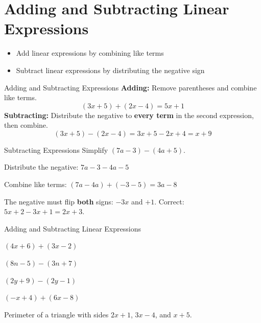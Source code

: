 \section{Adding and Subtracting Linear Expressions}

\begin{learningGoals}
\begin{itemize}
    \item Add linear expressions by combining like terms
    \item Subtract linear expressions by distributing the negative sign
\end{itemize}
\end{learningGoals}

\begin{conceptBox}{Adding and Subtracting Expressions}
\textbf{Adding:} Remove parentheses and combine like terms.
$$(3x + 5) + (2x - 4) = 5x + 1$$
\textbf{Subtracting:} Distribute the negative to \textbf{every term} in the second expression, then combine.
$$(3x + 5) - (2x - 4) = 3x + 5 - 2x + 4 = x + 9$$
\end{conceptBox}

\begin{workedExample}{Subtracting Expressions}
Simplify $(7a - 3) - (4a + 5)$.

Distribute the negative: $7a - 3 - 4a - 5$

Combine like terms: $(7a - 4a) + (-3 - 5) = 3a - 8$
\end{workedExample}

\begin{errorBox}
The negative must flip \textbf{both} signs: $-3x$ and $+1$.
Correct: $5x + 2 - 3x + 1 = 2x + 3$.
\end{errorBox}

\begin{practiceBox}{Adding and Subtracting Linear Expressions}
\resetProblems

\prob $(4x + 6) + (3x - 2)$

\prob $(8n - 5) - (3n + 7)$

\prob $(2y + 9) - (2y - 1)$

\prob $(-x + 4) + (6x - 8)$

\prob Perimeter of a triangle with sides $2x + 1$, $3x - 4$, and $x + 5$.

\end{practiceBox}
